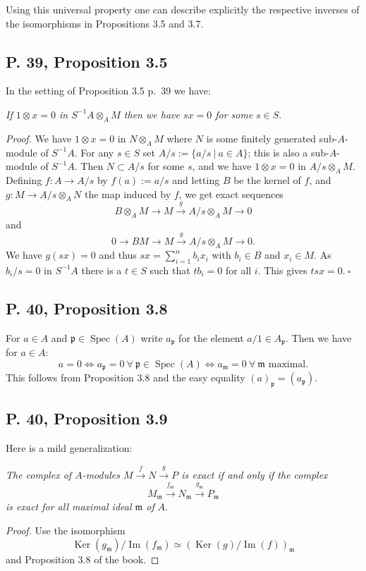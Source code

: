 \documentclass[parskip=half,fontsize=12pt]{scrartcl}%
\newcommand{\oo}{\operatorname}\newcommand{\ooo}{\operatorname*}
\newcommand{\mf}{\mathfrak}
\newcommand{\mmm}{\mf m}
\newcommand{\ppp}{\mf p}
\newcommand{\Spec}{\operatorname{Spec}}\newcommand{\Sp}{\operatorname{Spec}}
\newcommand{\xr}{\xrightarrow}
\begin{document}
Using this universal property one can describe explicitly the respective inverses of the isomorphisms in Propositions 3.5 and 3.7.

\subsection{P. 39, Proposition 3.5}%

In the setting of Proposition 3.5 p.~39 we have:

\emph{If $1\otimes x=0$ in $S^{-1}A\otimes_AM$ then we have $sx=0$ for some} $s\in S$.

\emph{Proof.} We have $1\otimes x=0$ in $N\otimes_AM$ where $N$ is some finitely generated sub-$A$-module of $S^{-1}A$. For any $s\in S$ set $A/s:=\{a/s\ |\ a\in A\}$; this is also a sub-$A$-module of $S^{-1}A$. Then $N\subset A/s$ for some $s$, and we have $1\otimes x=0$ in $A/s\otimes_AM$. Defining $f:A\to A/s$ by $f(a):=a/s$ and letting $B$ be the kernel of $f$, and $g:M\to A/s\otimes_AN$ the map induced by $f$, we get exact sequences 
$$
B\otimes_AM\to M\xr gA/s\otimes_AM\to0
$$ 
and 
$$
0\to BM\to M\xr gA/s\otimes_AM\to0.
$$ 
We have $g(sx)=0$ and thus $sx=\sum_{i=1}^nb_ix_i$ with $b_i\in B$ and $x_i\in M$. As $b_i/s=0$ in $S^{-1}A$ there is a $t\in S$ such that $tb_i=0$ for all $i$. This gives $tsx=0.\ \square$

\subsection{P. 40, Proposition 3.8}\label{38}%

For $a\in A$ and $\ppp\in\Spec(A)$ write $a_\ppp$ for the element $a/1\in A_\ppp$. Then we have for $a\in A$:
$$
a=0\iff a_\ppp=0\ \forall\ \ppp\in\Spec(A)\iff a_\mmm=0\ \forall\ \mmm\text{ maximal.}
$$ 
This follows from Proposition 3.8 and the easy equality $(a)_\ppp=(a_\ppp)$. 

\subsection{P. 40, Proposition 3.9}\label{re}%

Here is a mild generalization:

\emph{The complex of $A$-modules $M\xr fN\xr g P$ is exact if and only if the complex} 
$$
M_\mmm\xr{f_\mmm}N_\mmm\xr{g_\mmm}P_\mmm
$$ 
\emph{is exact for all maximal ideal $\mmm$ of} $A$.
\begin{proof}
Use the isomorphism 
$$
\oo{Ker}(g_\mmm)/\oo{Im}(f_\mmm)\simeq(\oo{Ker}(g)/\oo{Im}(f))_\mmm
$$ 
and Proposition 3.8 of the book.
\end{proof}
\end{document}

